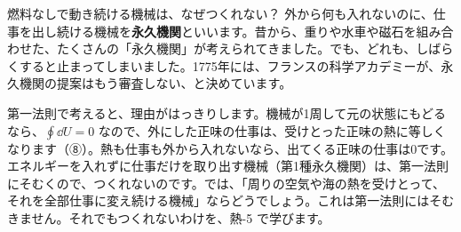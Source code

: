 \begin{column}{燃料なしで動き続ける機械は、なぜつくれない？}
外から何も入れないのに、仕事を出し続ける機械を\textbf{永久機関}といいます。昔から、重りや水車や磁石を組み合わせた、たくさんの「永久機関」が考えられてきました。でも、どれも、しばらくすると止まってしまいました。1775年には、フランスの科学アカデミーが、永久機関の提案はもう審査しない、と決めています。

第一法則で考えると、理由がはっきりします。機械が1周して元の状態にもどるなら、$\oint\dd U=0$ なので、外にした正味の仕事は、受けとった正味の熱に等しくなります（⑧）。熱も仕事も外から入れないなら、出てくる正味の仕事は0です。エネルギーを入れずに仕事だけを取り出す機械（第1種永久機関）は、第一法則にそむくので、つくれないのです。では、「周りの空気や海の熱を受けとって、それを全部仕事に変え続ける機械」ならどうでしょう。これは第一法則にはそむきません。それでもつくれないわけを、熱-5 で学びます。
\end{column}

